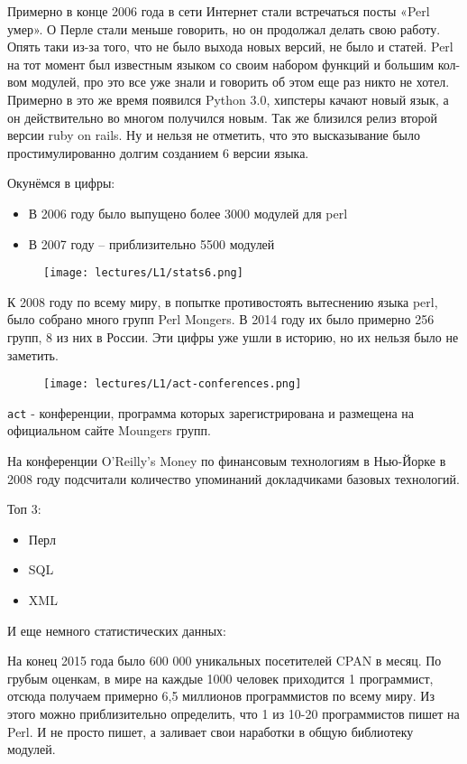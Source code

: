 Примерно в конце 2006 года в сети Интернет стали встречаться посты «Perl умер». О Перле стали меньше говорить, но он продолжал делать свою работу. Опять таки из-за того, что не было выхода новых версий, не было и статей. Perl на тот момент был известным языком со своим набором функций и большим кол-вом модулей, про это все уже знали и говорить об этом еще раз никто не хотел. Примерно в это же время появился Python 3.0, хипстеры качают новый язык, а он действительно во многом получился новым. Так же близился релиз второй версии ruby on rails. Ну и нельзя не отметить, что это высказывание было простимулированно долгим созданием 6 версии языка.

Окунёмся в цифры:
\begin{itemize}
 \item В 2006 году было выпущено более 3000 модулей для perl
 \item В 2007 году -- приблизительно 5500 модулей
\end{itemize}

\begin{figure}[H] \centering
  \texttt{[image: lectures/L1/stats6.png]}
\end{figure}\noindent

К 2008 году по всему миру, в попытке противостоять вытеснению языка perl, было собрано много групп Perl Mongers. В 2014 году их было примерно 256 групп, 8 из них в России. Эти цифры уже ушли в историю, но их нельзя было не заметить.

\begin{figure}[H] \centering
  \texttt{[image: lectures/L1/act-conferences.png]}
\end{figure}\noindent

\verb|act| - конференции, программа которых зарегистрирована и размещена на официальном сайте Moungers групп.

На конференции O'Reilly's Money по финансовым технологиям в Нью-Йорке в 2008 году подсчитали количество упоминаний докладчиками базовых технологий.

Топ 3:
\begin{itemize}
 \item Перл
 \item SQL
 \item XML
\end{itemize}

И еще немного статистических данных:

На конец 2015 года было 600 000 уникальных посетителей CPAN в месяц. По грубым оценкам, в мире на каждые 1000 человек приходится 1 программист, отсюда получаем примерно 6,5 миллионов программистов по всему миру. Из этого можно приблизительно определить, что 1 из 10-20 программистов пишет на Perl. И не просто пишет, а заливает свои наработки в общую библиотеку модулей.


